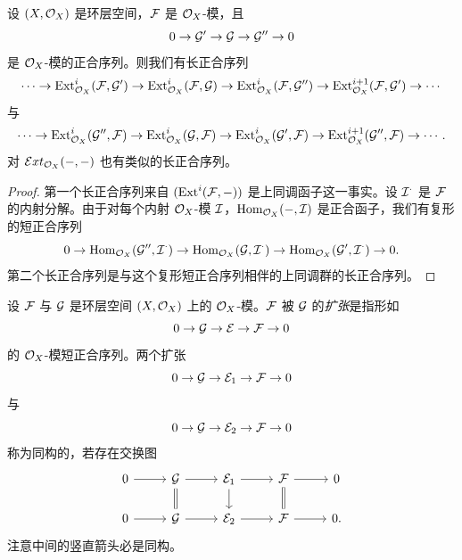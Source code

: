 \begin{proposition}\label{it:2.1.14}
设 $(X,\cO_X)$ 是环层空间，$\cF$ 是 $\cO_X$-模，且
\[
0\to\cG'\to\cG\to\cG''\to 0
\]
是 $\cO_X$-模的正合序列。则我们有长正合序列
\[
\cdots\to\Ext^i_{\cO_X}(\cF,\cG')\to\Ext^i_{\cO_X}(\cF,\cG)\to\Ext^i_{\cO_X}(\cF,\cG'')\to\Ext^{i+1}_{\cO_X}(\cF,\cG')\to\cdots
\]
与
\[
\cdots\to\Ext^i_{\cO_X}(\cG'',\cF)\to\Ext^i_{\cO_X}(\cG,\cF)\to\Ext^i_{\cO_X}(\cG',\cF)\to\Ext^{i+1}_{\cO_X}(\cG'',\cF)\to\cdots.
\]
对 $\mathcal{E}xt_{\cO_X}(-,-)$ 也有类似的长正合序列。
\end{proposition}
\begin{proof}
第一个长正合序列来自 $(\Ext^i(\cF,-))$ 是上同调函子这一事实。设 $\cI^\cdot$ 是 $\cF$ 的内射分解。由于对每个内射 $\cO_X$-模 $\cI$，$\Hom_{\cO_X}(-,\cI)$ 是正合函子，我们有复形的短正合序列
\[
0\to\Hom_{\cO_X}(\cG'',\cI^\cdot)\to\Hom_{\cO_X}(\cG,\cI^\cdot)\to\Hom_{\cO_X}(\cG',\cI^\cdot)\to 0.
\]
第二个长正合序列是与这个复形短正合序列相伴的上同调群的长正合序列。
\end{proof}

设 $\cF$ 与 $\cG$ 是环层空间 $(X,\cO_X)$ 上的 $\cO_X$-模。$\cF$ 被 $\cG$ 的\emph{扩张}是指形如
\[
0\to\cG\to\cE\to\cF\to 0
\]
的 $\cO_X$-模短正合序列。两个扩张
\[
0\to\cG\to\cE_1\to\cF\to 0
\]
与
\[
0\to\cG\to\cE_2\to\cF\to 0
\]
称为同构的，若存在交换图
\[\begin{tikzcd}[column sep=2.6em,row sep=1.6em]
0 \arrow[r] & \cG \arrow[r] \arrow[d,equal] & \cE_1 \arrow[r] \arrow[d] & \cF \arrow[r] \arrow[d,equal] & 0 \\
0 \arrow[r] & \cG \arrow[r] & \cE_2 \arrow[r] & \cF \arrow[r] & 0.
\end{tikzcd}\]
注意中间的竖直箭头必是同构。

